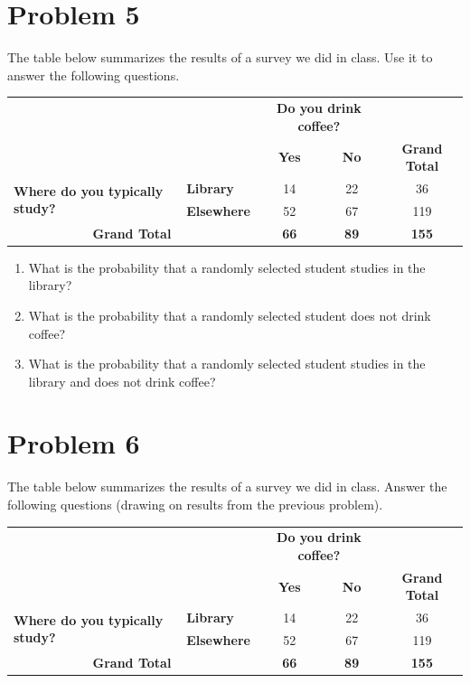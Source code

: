 \documentclass[12pt,twoside]{article}
\newcommand{\pts}[1]{\marginpar{ \small\hspace{0pt} \textit{[#1]} } }
\newcommand{\?}{\stackrel{?}{=}}
\begin{document}
\section*{Problem 5 }
The  table below summarizes the results of a survey we did in class. 
Use it to answer the following questions.
\begin{table}[h!]\small
\centering
\begin{tabular}{|l|l|c|c|c|}
\hline
&  & \multicolumn{2}{c|}{\textbf{Do you drink coffee?}} &  \\\cline{3-5}
&  & \textbf{Yes} & \textbf{No} & \textbf{Grand Total} \\
\hline
\multirow{2}{*}{\textbf{Where do you typically study?}} & \textbf{Library} & 14 & 22 & 36 \\
\cline{2-5}
& \textbf{Elsewhere} & 52 & 67 & 119 \\
\hline
\multicolumn{2}{|c|}{\textbf{Grand Total}} &  \textbf{66} & \textbf{89} & \textbf{155} \\
\hline
\end{tabular}
\end{table}

\begin{enumerate}[\bf (a)]
  \item What is the probability that a randomly selected student studies in the library? \pts{2} \vspace{20ex}
  \item What is the probability that a randomly selected student does not drink coffee? \pts{2} \vspace{20ex}
  \item What is the \pts{2} probability that a randomly selected student studies in the library and does not drink coffee?
  \vspace{20ex}

\end{enumerate}
\eject

\section*{Problem 6 }
The  table below summarizes the results of a survey we did in class. 
Answer the following questions (drawing on results from the previous problem).
\begin{table}[h!]\small
\centering
\begin{tabular}{|l|l|c|c|c|}
\hline
&  & \multicolumn{2}{c|}{\textbf{Do you drink coffee?}} &  \\\cline{3-5}
&  & \textbf{Yes} & \textbf{No} & \textbf{Grand Total} \\
\hline
\multirow{2}{*}{\textbf{Where do you typically study?}} & \textbf{Library} & 14 & 22 & 36 \\
\cline{2-5}
& \textbf{Elsewhere} & 52 & 67 & 119 \\
\hline
\multicolumn{2}{|c|}{\textbf{Grand Total}} &  \textbf{66} & \textbf{89} & \textbf{155} \\
\hline
\end{tabular}
\end{table}
\end{document}
